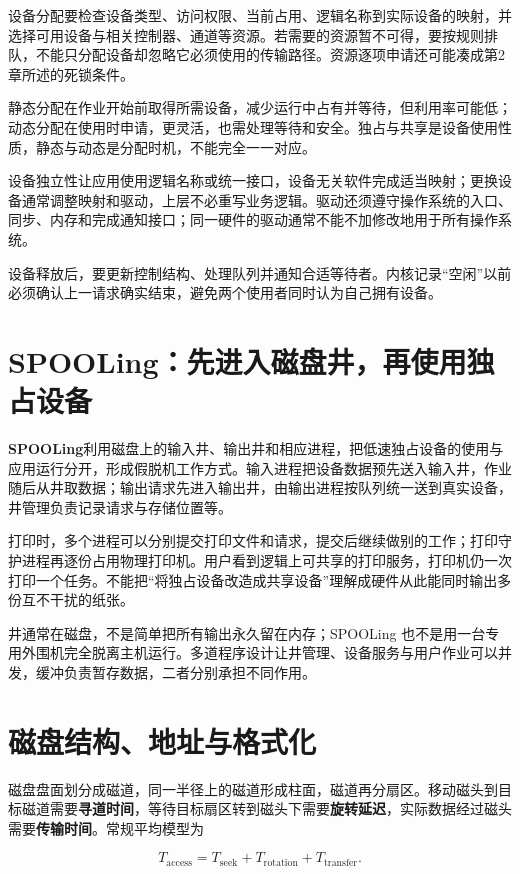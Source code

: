 设备分配要检查设备类型、访问权限、当前占用、逻辑名称到实际设备的映射，并选择可用设备与相关控制器、通道等资源。若需要的资源暂不可得，要按规则排队，不能只分配设备却忽略它必须使用的传输路径。资源逐项申请还可能凑成第2章所述的死锁条件。

静态分配在作业开始前取得所需设备，减少运行中占有并等待，但利用率可能低；动态分配在使用时申请，更灵活，也需处理等待和安全。独占与共享是设备使用性质，静态与动态是分配时机，不能完全一一对应。

设备独立性让应用使用逻辑名称或统一接口，设备无关软件完成适当映射；更换设备通常调整映射和驱动，上层不必重写业务逻辑。驱动还须遵守操作系统的入口、同步、内存和完成通知接口；同一硬件的驱动通常不能不加修改地用于所有操作系统。

设备释放后，要更新控制结构、处理队列并通知合适等待者。内核记录``空闲''以前必须确认上一请求确实结束，避免两个使用者同时认为自己拥有设备。

\section{SPOOLing：先进入磁盘井，再使用独占设备}\label{OS05-7-7}

\textbf{SPOOLing}利用磁盘上的输入井、输出井和相应进程，把低速独占设备的使用与应用运行分开，形成假脱机工作方式。输入进程把设备数据预先送入输入井，作业随后从井取数据；输出请求先进入输出井，由输出进程按队列统一送到真实设备，井管理负责记录请求与存储位置等。

打印时，多个进程可以分别提交打印文件和请求，提交后继续做别的工作；打印守护进程再逐份占用物理打印机。用户看到逻辑上可共享的打印服务，打印机仍一次打印一个任务。不能把``将独占设备改造成共享设备''理解成硬件从此能同时输出多份互不干扰的纸张。

井通常在磁盘，不是简单把所有输出永久留在内存；SPOOLing 也不是用一台专用外围机完全脱离主机运行。多道程序设计让井管理、设备服务与用户作业可以并发，缓冲负责暂存数据，二者分别承担不同作用。

\section{磁盘结构、地址与格式化}\label{OS05-7-8}

磁盘盘面划分成磁道，同一半径上的磁道形成柱面，磁道再分扇区。移动磁头到目标磁道需要\textbf{寻道时间}，等待目标扇区转到磁头下需要\textbf{旋转延迟}，实际数据经过磁头需要\textbf{传输时间}。常规平均模型为

\[T_{\mathrm{access}}=T_{\mathrm{seek}}+T_{\mathrm{rotation}}+T_{\mathrm{transfer}}.\]

